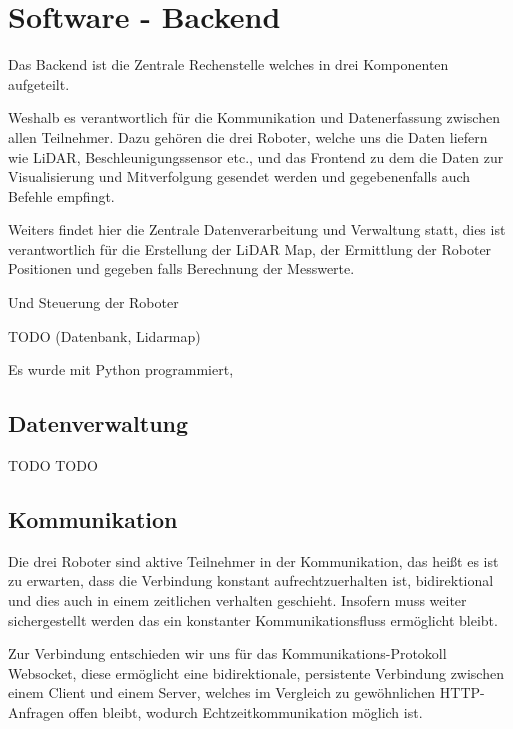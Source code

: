 

\chapter{Software - Backend}
\label{sec:software_backend}
Das Backend ist die Zentrale Rechenstelle welches in drei Komponenten aufgeteilt.

Weshalb es verantwortlich für die Kommunikation und Datenerfassung zwischen allen Teilnehmer. 
Dazu gehören die drei Roboter, welche uns die Daten liefern wie LiDAR, Beschleunigungssensor etc., 
und das Frontend zu dem die Daten zur Visualisierung und Mitverfolgung gesendet werden 
und gegebenenfalls auch Befehle empfingt.

Weiters findet hier die Zentrale Datenverarbeitung und Verwaltung statt, 
dies ist verantwortlich für die Erstellung der LiDAR Map, 
der Ermittlung der Roboter Positionen 
und gegeben falls Berechnung der Messwerte. 

Und Steuerung der Roboter

TODO (Datenbank, Lidarmap)

Es wurde mit Python programmiert, 

\section{Datenverwaltung}
\label{subsec:backend_data}
TODO
TODO

\section{Kommunikation}
\label{subsec:Kommunikation}
Die drei Roboter sind aktive Teilnehmer in der Kommunikation, 
das heißt es ist zu erwarten, dass die Verbindung konstant aufrechtzuerhalten ist,
bidirektional und dies auch in einem zeitlichen verhalten geschieht. 
Insofern muss weiter sichergestellt werden das ein konstanter Kommunikationsfluss ermöglicht bleibt.

Zur Verbindung entschieden wir uns für das Kommunikations-Protokoll Websocket, 
diese ermöglicht eine bidirektionale, persistente Verbindung zwischen einem Client und einem Server,
welches im Vergleich zu gewöhnlichen HTTP-Anfragen offen bleibt, wodurch Echtzeitkommunikation möglich ist.


